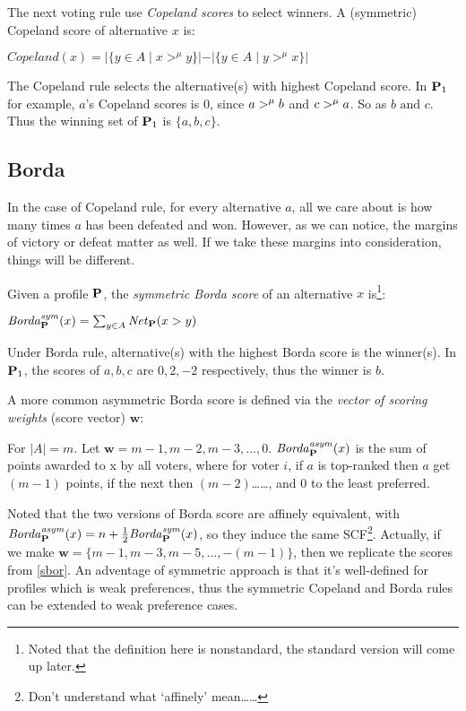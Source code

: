 The next voting rule use \textit{Copeland scores} to select winners. A (symmetric) Copeland score of alternative $x$ is:
\begin{definition}
    \label{Copeland}
    $\mathit{Copeland}(x) = |\{y \in A\;|\; x >^\mu y\}| - |\{y \in A\;|\; y >^\mu x\}|$
\end{definition}

The Copeland rule selects the alternative(s) with highest Copeland score. In $\mathbf{P}_1$ for example, $a$'s Copeland scores is $0$, since $a >^\mu b$ and $c >^\mu a$. So as $b \mbox{ and } c$. Thus the winning set of $\mathbf{P}_1$ is $\{a,b,c\}$.

\subsection{Borda}

In the case of Copeland rule, for every alternative $a$, all we care about is how many times $a$ has been defeated and won. However, as we can notice, the margins of victory or defeat matter as well. If we take these margins into consideration, things will be different.

Given a profile $\mathbf{P}$, the \textit{symmetric Borda score} of an alternative $x$ is\footnote{Noted that the definition here is nonstandard, the standard version will come up later.}:
\begin{definition}
    \label{sbor}
    $\mathit{Borda}^{\mathit{sym}}_{\mathbf{P}} (x) = \sum_{y \in A} \mathit{Net}_{\mathbf{P}} (x > y)$
\end{definition}

Under Borda rule, alternative(s) with the highest Borda score is the winner(s). In $\mathbf{P}_1$, the scores of $a,b,c$ are $0,2,-2$ respectively, thus the winner is $b$.

A more common asymmetric Borda score is defined via the \textit{vector of scoring weights} (score vector) $\mathbf{w}$:

\begin{definition}
    For $|A| = m$. Let $\mathbf{w} = {m-1,m-2,m-3,\dots,0}$. $\mathit{Borda}^{\mathit{asym}}_{\mathbf{P}} (x)$ is the sum of points awarded to x by all voters, where for voter $i$, if $a$ is top-ranked then $a$ get $(m-1)$ points, if the next then $(m-2)$\dots\dots, and $0$ to the least preferred.
\end{definition}

Noted that the two versions of Borda score are affinely equivalent, with $\mathit{Borda}^{\mathit{asym}}_{\mathbf{P}} (x) = n + \frac{1}{2} \mathit{Borda}^{\mathit{sym}}_{\mathbf{P}} (x)$, so they induce the same SCF\footnote{Don't understand what `affinely' mean\dots\dots}. Actually, if we make $\mathbf{w} = \{m-1,m-3,m-5,\dots,-(m-1)\}$, then we replicate the scores from \cref{sbor}. An adventage of symmetric approach is that it's well-defined for profiles which is weak preferences, thus the symmetric Copeland and Borda rules can be extended to weak preference cases.

